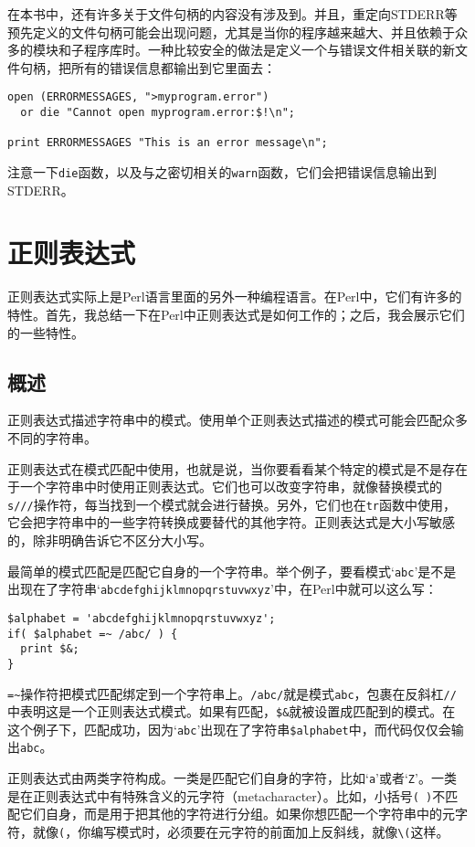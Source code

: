 在本书中，还有许多关于文件句柄的内容没有涉及到。并且，重定向STDERR等预先定义的文件句柄可能会出现问题，尤其是当你的程序越来越大、并且依赖于众多的模块和子程序库时。一种比较安全的做法是定义一个与错误文件相关联的新文件句柄，把所有的错误信息都输出到它里面去：

\begin{lstlisting}
open (ERRORMESSAGES, ">myprogram.error") 
  or die "Cannot open myprogram.error:$!\n";

print ERRORMESSAGES "This is an error message\n";
\end{lstlisting}

注意一下\verb|die|函数，以及与之密切相关的\verb|warn|函数，它们会把错误信息输出到STDERR。

\section{正则表达式}
正则表达式实际上是Perl语言里面的另外一种编程语言。在Perl中，它们有许多的特性。首先，我总结一下在Perl中正则表达式是如何工作的；之后，我会展示它们的一些特性。

\subsection{概述}
正则表达式描述字符串中的模式。使用单个正则表达式描述的模式可能会匹配众多不同的字符串。

正则表达式在模式匹配中使用，也就是说，当你要看看某个特定的模式是不是存在于一个字符串中时使用正则表达式。它们也可以改变字符串，就像替换模式的\verb|s///|操作符，每当找到一个模式就会进行替换。另外，它们也在\verb|tr|函数中使用，它会把字符串中的一些字符转换成要替代的其他字符。正则表达式是大小写敏感的，除非明确告诉它不区分大小写。

最简单的模式匹配是匹配它自身的一个字符串。举个例子，要看模式`\verb|abc|'是不是出现在了字符串`\verb|abcdefghijklmnopqrstuvwxyz|'中，在Perl中就可以这么写：

\begin{lstlisting}
$alphabet = 'abcdefghijklmnopqrstuvwxyz';
if( $alphabet =~ /abc/ ) {
  print $&;
}
\end{lstlisting}

\verb|=~|操作符把模式匹配绑定到一个字符串上。\verb|/abc/|就是模式\verb|abc|，包裹在反斜杠\verb|//|中表明这是一个正则表达式模式。如果有匹配，\verb|$&|就被设置成匹配到的模式。在这个例子下，匹配成功，因为`\verb|abc|'出现在了字符串\verb|$alphabet|中，而代码仅仅会输出\verb|abc|。

正则表达式由两类字符构成。一类是匹配它们自身的字符，比如`\verb|a|'或者`\verb|Z|'。一类是在正则表达式中有特殊含义的元字符（metacharacter）。比如，小括号\verb|( )|不匹配它们自身，而是用于把其他的字符进行分组。如果你想匹配一个字符串中的元字符，就像\verb|(|，你编写模式时，必须要在元字符的前面加上反斜线，就像\verb|\(|这样。

